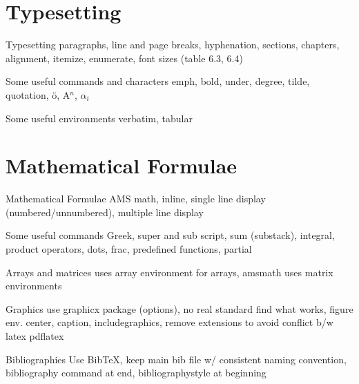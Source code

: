 \documentclass[11pt]{beamer}
\begin{document}
%
%
\section{Typesetting}
\begin{frame}{Typesetting}
paragraphs, line and page breaks, hyphenation, sections, chapters, alignment, itemize, enumerate, font sizes (table 6.3, 6.4)
\end{frame}

%
%
\begin{frame}{Some useful commands and characters}
emph, bold, under, degree, tilde, quotation, \"{o}, A$^{n}$, $\alpha_i$
\end{frame}

%
%
\begin{frame}{Some useful environments}
verbatim, tabular
\end{frame}

%
%
\section{Mathematical Formulae}
\begin{frame}{Mathematical Formulae}
AMS math, inline, single line display (numbered/unnumbered), multiple line display
\end{frame}

%
%
\begin{frame}{Some useful commands}
Greek, super and sub script, sum (substack), integral, product operators, dots, frac, predefined functions, partial
\end{frame}

%
%
\begin{frame}{Arrays and matrices}
uses array environment for arrays, amsmath uses matrix environments
\end{frame}

%
%
\begin{frame}{Graphics}
use graphicx package (options), no real standard find what works, figure env. center, caption, includegraphics, remove extensions to avoid conflict b/w latex pdflatex
\end{frame}

%
%
\begin{frame}{Bibliographies}
Use BibTeX, keep main bib file w/ consistent naming convention, bibliography command at end, bibliographystyle at beginning
\end{frame}
\end{document}
